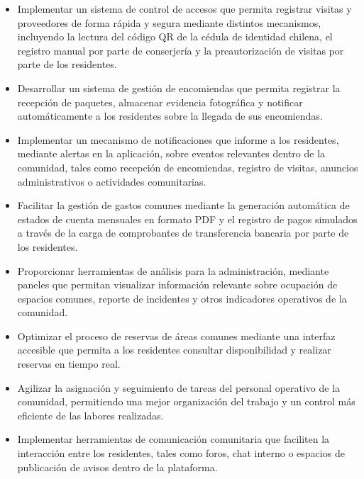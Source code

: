 \begin{itemize}

\item Implementar un sistema de control de accesos que permita registrar visitas y proveedores de forma rápida y segura mediante distintos mecanismos, incluyendo la lectura del código QR de la cédula de identidad chilena, el registro manual por parte de conserjería y la preautorización de visitas por parte de los residentes.

\item Desarrollar un sistema de gestión de encomiendas que permita registrar la recepción de paquetes, almacenar evidencia fotográfica y notificar automáticamente a los residentes sobre la llegada de sus encomiendas.

\item Implementar un mecanismo de notificaciones que informe a los residentes, mediante alertas en la aplicación, sobre eventos relevantes dentro de la comunidad, tales como recepción de encomiendas, registro de visitas, anuncios administrativos o actividades comunitarias.

\item Facilitar la gestión de gastos comunes mediante la generación automática de estados de cuenta mensuales en formato PDF y el registro de pagos simulados a través de la carga de comprobantes de transferencia bancaria por parte de los residentes.

\item Proporcionar herramientas de análisis para la administración, mediante paneles que permitan visualizar información relevante sobre ocupación de espacios comunes, reporte de incidentes y otros indicadores operativos de la comunidad.

\item Optimizar el proceso de reservas de áreas comunes mediante una interfaz accesible que permita a los residentes consultar disponibilidad y realizar reservas en tiempo real.

\item Agilizar la asignación y seguimiento de tareas del personal operativo de la comunidad, permitiendo una mejor organización del trabajo y un control más eficiente de las labores realizadas.

\item Implementar herramientas de comunicación comunitaria que faciliten la interacción entre los residentes, tales como foros, chat interno o espacios de publicación de avisos dentro de la plataforma.

\end{itemize}
